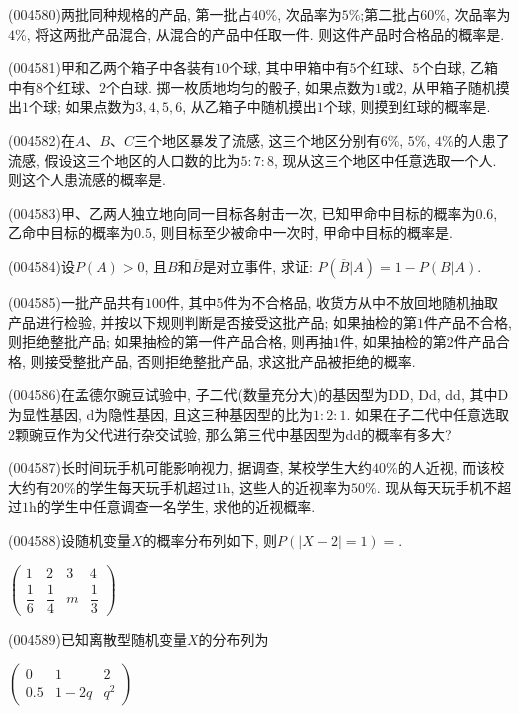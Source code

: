 \item (004580)两批同种规格的产品, 第一批占$40\%$, 次品率为$5\%$;第二批占$60\%$, 次品率为$4\%$, 将这两批产品混合, 从混合的产品中任取一件. 则这件产品时合格品的概率是.
\item (004581)甲和乙两个箱子中各装有$10$个球, 其中甲箱中有$5$个红球、$5$个白球, 乙箱中有$8$个红球、$2$个白球. 掷一枚质地均匀的骰子, 如果点数为$1$或$2$, 从甲箱子随机摸出$1$个球; 如果点数为$3, 4, 5, 6$, 从乙箱子中随机摸出$1$个球, 则摸到红球的概率是.
\item (004582)在$A$、$B$、$C$三个地区暴发了流感, 这三个地区分别有$6\%$, $5\%$, $4\%$的人患了流感, 假设这三个地区的人口数的比为$5: 7: 8$, 现从这三个地区中任意选取一个人. 则这个人患流感的概率是.
\item (004583)甲、乙两人独立地向同一目标各射击一次, 已知甲命中目标的概率为$0.6$, 乙命中目标的概率为$0.5$, 则目标至少被命中一次时, 甲命中目标的概率是.
\item (004584)设$P(A)>0$, 且$B$和$\overline B$是对立事件, 求证: $P(\overline B|A)=1-P(B|A)$.
\item (004585)一批产品共有$100$件, 其中$5$件为不合格品, 收货方从中不放回地随机抽取产品进行检验, 并按以下规则判断是否接受这批产品; 如果抽检的第$1$件产品不合格, 则拒绝整批产品; 如果抽检的第一件产品合格, 则再抽$1$件, 如果抽检的第$2$件产品合格, 则接受整批产品, 否则拒绝整批产品, 求这批产品被拒绝的概率.
\item (004586)在孟德尔豌豆试验中, 子二代(数量充分大)的基因型为DD, Dd, dd, 其中D为显性基因, d为隐性基因, 且这三种基因型的比为$1: 2: 1$. 如果在子二代中任意选取$2$颗豌豆作为父代进行杂交试验, 那么第三代中基因型为dd的概率有多大?
\item (004587)长时间玩手机可能影响视力, 据调查, 某校学生大约$40\%$的人近视, 而该校大约有$20\%$的学生每天玩手机超过$1\text{h}$, 这些人的近视率为$50\%$. 现从每天玩手机不超过$1\text{h}$的学生中任意调查一名学生, 求他的近视概率.
\item (004588)设随机变量$X$的概率分布列如下, 则$P(|X-2|=1)=$.
\begin{center}
    $\begin{pmatrix}
        1 & 2 & 3 & 4\\ 
        \dfrac 16 & \dfrac 14 & m & \dfrac 13      
    \end{pmatrix}$
\end{center}
\item (004589)已知离散型随机变量$X$的分布列为
\begin{center}
    $\begin{pmatrix}
        0 & 1 & 2 \\ 
        0.5 & 1-2q & q^2 
    \end{pmatrix}$
\end{center}
